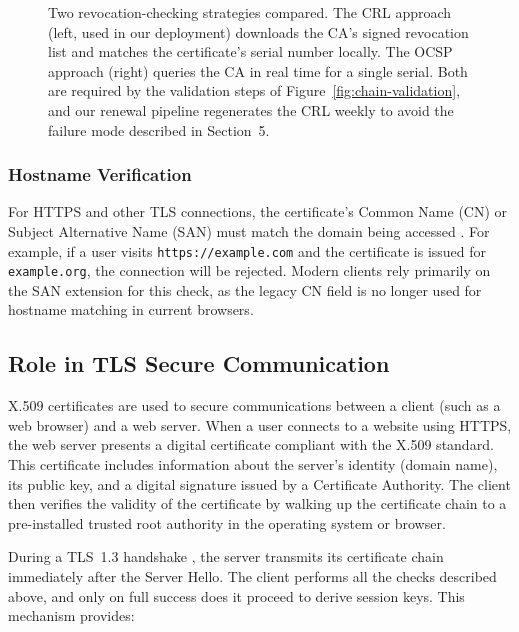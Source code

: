 \documentclass[10pt,twocolumn]{article}
\begin{document}
\begin{figure}[H]
{%
}
\caption{Two revocation-checking strategies compared. The CRL approach (left, used in our deployment) downloads the CA's signed revocation list and matches the certificate's serial number locally. The OCSP approach (right) queries the CA in real time for a single serial. Both are required by the validation steps of Figure~\ref{fig:chain-validation}, and our renewal pipeline regenerates the CRL weekly to avoid the failure mode described in Section~5.}
\label{fig:crl-vs-ocsp}
\end{figure}

\subsubsection{Hostname Verification}

For HTTPS and other TLS connections, the certificate's Common Name (CN) or
Subject Alternative Name (SAN) must match the domain being accessed
\cite{rfc2818}. For example, if a user visits \texttt{https://example.com}
and the certificate is issued for \texttt{example.org}, the connection will
be rejected. Modern clients rely primarily on the SAN extension for this
check, as the legacy CN field is no longer used for hostname matching in
current browsers.

\subsection{Role in TLS Secure Communication}

X.509 certificates are used to secure communications between a client (such
as a web browser) and a web server. When a user connects to a website using
HTTPS, the web server presents a digital certificate compliant with the X.509
standard. This certificate includes information about the server's identity
(domain name), its public key, and a digital signature issued by a Certificate
Authority. The client then verifies the validity of the certificate by walking
up the certificate chain to a pre-installed trusted root authority in the
operating system or browser.

During a TLS~1.3 handshake \cite{rfc8446}, the server transmits its
certificate chain immediately after the Server Hello. The client performs all
the checks described above, and only on full success does it proceed to derive
session keys. This mechanism provides:
\end{document}
